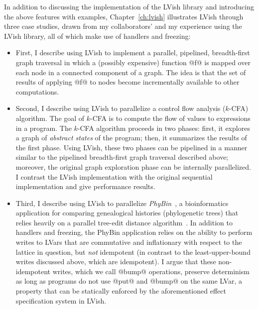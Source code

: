 In addition to discussing the implementation of the LVish library and
introducing the above features with examples, Chapter~\ref{ch:lvish}
illustrates LVish through three case studies, drawn from my
collaborators' and my experience using the LVish library, all of which
make use of handlers and freezing:
\begin{itemize}
\item First, I describe using LVish to implement a parallel,
  pipelined, breadth-first graph traversal in which a (possibly
  expensive) function @f@ is mapped over each node in a connected
  component of a graph.  The idea is that the set of results of
  applying @f@ to nodes become incrementally available to other
  computations.
\item Second, I describe using LVish to parallelize a control flow
  analysis ($k$-CFA) algorithm.  The goal of $k$-CFA is to compute the
  flow of values to expressions in a program.  The $k$-CFA algorithm
  proceeds in two phases: first, it explores a graph of \emph{abstract
    states} of the program; then, it summarizes the results of the
  first phase.  Using LVish, these two phases can be pipelined in a
  manner similar to the pipelined breadth-first graph traversal
  described above; moreover, the original graph exploration phase can
  be internally parallelized.  I contrast the LVish implementation
  with the original sequential implementation and give performance
  results.
\item Third, I describe using LVish to parallelize
  \emph{PhyBin}~\cite{PhyBin}, a bioinformatics application for
  comparing genealogical histories (phylogenetic trees) that relies
  heavily on a parallel tree-edit distance algorithm~\cite{hashrf}.
  In addition to handlers and freezing, the PhyBin application relies
  on the ability to perform writes to LVars that are commutative and
  inflationary with respect to the lattice in question, but \emph{not}
  idempotent (in contrast to the least-upper-bound writes discussed
  above, which are idempotent).  I argue that these non-idempotent
  writes, which we call @bump@ operations, preserve determinism as
  long as programs do not use @put@ and @bump@ on the same LVar, a
  property that can be statically enforced by the aforementioned
  effect specification system in LVish.
\end{itemize}

